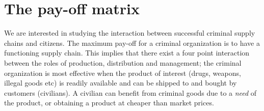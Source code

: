 \documentclass[a4paper, 11pt, twocolumn]{article}
\begin{document}
\section{The pay-off matrix}
\label{sec:orgb49807d}
We  are  interested  in  studying  the  interaction  between
successful criminal supply chains  and citizens. The maximum
pay-off for a criminal organization is to have a functioning
supply chain.  This implies that  there exist a  four point
interaction  between the  roles of  production, distribution
and management; the criminal  organization is most effective
when the product of  interest (drugs, weapons, illegal goods
etc) is readily  available and can be shipped  to and bought
by  customers  (civilians).  A  civilian  can  benefit  from
criminal goods due to a  \emph{need} of the product, or obtaining
a product at cheaper than market prices.
\end{document}
